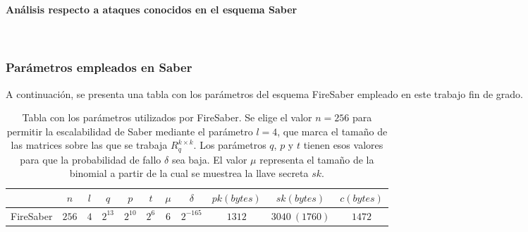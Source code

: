 \paragraph{Análisis respecto a ataques conocidos en el esquema Saber}
\mbox{}\\
\newpage
\subsubsection{Parámetros empleados en Saber}
A continuación, se presenta una tabla con los parámetros del esquema FireSaber empleado en este trabajo fin de grado.
\begin{table}[H]
	\centering
	\renewcommand{\arraystretch}{1.2}
	\begin{tabular}{lcccccccccc}
		\hline
		&\(n\)&\(l\)&\(q\)&\(p\)&\(t\)&\(\mu\)&\(\delta\)&\(pk (bytes)\)&\(sk (bytes)\)&\(c (bytes)\)\\
		\hline
		FireSaber&\(256\)&\(4\)&\(2^{13}\)&\(2^{10}\)&\(2^{6}\)&\(6\)&\(2^{-165}\)&\(1312\)&\(3040 \ (1760)\)&\(1472\)\\
		\hline
	\end{tabular}
	\caption{Tabla con los parámetros utilizados por FireSaber. Se elige el valor \(n=256\) para permitir la escalabilidad de Saber mediante el parámetro \(l=4\), que marca el tamaño de las matrices sobre las que se trabaja \(R_q^{k\times k}\). Los parámetros \(q\), \(p\) y  \(t\) tienen esos valores para que la probabilidad de fallo \(\delta\) sea baja. El valor \(\mu\) representa el tamaño de la binomial a partir de la cual se muestrea la llave secreta \(sk\).}
	\label{tab:SaberParams}
\end{table}

